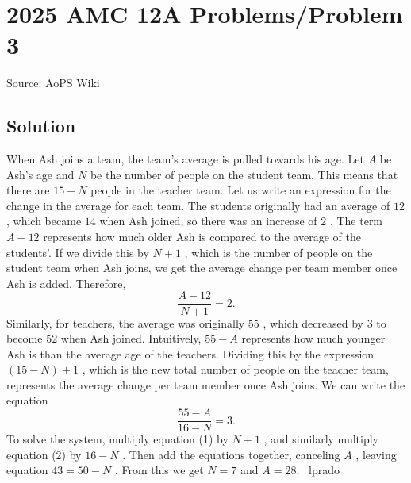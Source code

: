 \documentclass[12pt]{article}
\begin{document}
\section*{{2025 AMC 12A Problems/Problem 3}}
Source: AoPS Wiki

\subsection*{Solution}
When Ash joins a team, the team's average is pulled towards his age. Let $A$ be Ash's age and $N$ be the number of people on the student team. This means that there are $15-N$ people in the teacher team. Let us write an expression for the change in the average for each team. The students originally had an average of $12$ , which became $14$ when Ash joined, so there was an increase of $2$ . The term $A-12$ represents how much older Ash is compared to the average of the students'. If we divide this by $N+1$ , which is the number of people on the student team when Ash joins, we get the average change per team member once Ash is added. Therefore, \[\frac{A-12}{N+1} = 2.\] Similarly, for teachers, the average was originally $55$ , which decreased by $3$ to become $52$ when Ash joined. Intuitively, $55-A$ represents how much younger Ash is than the average age of the teachers. Dividing this by the expression $(15-N)+1$ , which is the new total number of people on the teacher team, represents the average change per team member once Ash joins. We can write the equation \[\frac{55-A}{16-N} = 3.\] To solve the system, multiply equation (1) by $N+1$ , and similarly multiply equation (2) by $16-N$ . Then add the equations together, canceling $A$ , leaving equation $43=50-N$ . From this we get $N=7$ and $A= \boxed{28}.$ ~lprado
\end{document}
